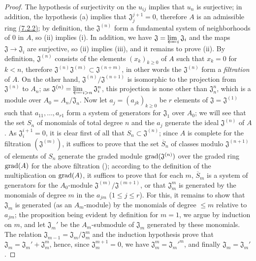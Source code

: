 \begin{proof}
\label{proof-0.7.2.7}
The hypothesis of surjectivity on the $u_{ij}$ implies that $u_n$ is surjective;
in addition, the hypothesis (a) implies that $\mathfrak{J}_j^{j+1}=0$, therefore
$A$ is an admissible ring \hyperref[0.7.2.2]{(7.2.2)}; by definition, the
$\mathfrak{J}^{(n)}$ form a fundamental system of neighborhoods of $0$ in $A$,
so (ii) implies (i). In addition, we have
$\mathfrak{J}=\varprojlim_i\mathfrak{J}_i$ and the maps
$\mathfrak{J}\to\mathfrak{J}_i$ are surjective, so (ii) implies (iii), and it
remains to prove (ii). By definition, $\mathfrak{J}^{(n)}$ consists of the
elements $(x_k)_{k\geqslant 0}$ of $A$ such that $x_k=0$ for $k<n$, therefore
$\mathfrak{J}^{(n)}\mathfrak{J}^{(m)}\subset\mathfrak{J}^{(n+m)}$, in other
words the $\mathfrak{J}^{(n)}$ form a {\em filtration} of $A$. On the other
hand, $\mathfrak{J}^{(n)}/\mathfrak{J}^{(n+1)}$ is isomorphic to the projection
from $\mathfrak{J}^{(n)}$ to $A_n$; as
$\mathfrak{J}^{(n)}=\varprojlim_{i>n}\mathfrak{J}_i^n$, this projection is none
other than $\mathfrak{J}_n^n$, which is a module over $A_0=A_n/\mathfrak{J}_n$.
Now let $a_j=(a_{jk})_{k\geqslant 0}$ be $r$ elements of
$\mathfrak{J}=\mathfrak{J}^{(1)}$ such that $a_{11},\dots,a_{r1}$ form a system
of generators for $\mathfrak{J}_1$ over $A_0$; we will see that the set $S_n$ of
monomials of total degree $n$ and the $a_j$ generate the ideal
$\mathfrak{J}^{(n)}$ of $A$. As $\mathfrak{J}_i^{i+1}=0$, it is clear first of
all that $S_n\subset\mathfrak{J}^{(n)}$; since $A$ is complete for the
filtration $(\mathfrak{J}^{(m)})$, it suffices to prove that the set
$\overline{S}_n$ of classes modulo $\mathfrak{J}^{(n+1)}$ of elements of $S_n$
generate the graded module ${\mathop{\mathrm{grad}}\nolimits}(\mathfrak{J}^{(n)})$ over the graded ring
${\mathop{\mathrm{grad}}\nolimits}(A)$ for the above filtration (\cite[p.~18--06, lemme]{I-1}); according to
the definition of the multiplication on ${\mathop{\mathrm{grad}}\nolimits}(A)$,
it suffices to prove that for each $m$, $\overline{S}_m$ is a system of
generators for the $A_0$-module $\mathfrak{J}^{(m)}/\mathfrak{J}^{(m+1)}$, or
that $\mathfrak{J}_m^m$ is generated by the monomials of degree $m$ in the
$a_{jm}$ ($1\leqslant j\leqslant r$). For this, it remains to show that
$\mathfrak{J}_m$ is generated (as an $A_m$-module) by the monomials of degree
$\leqslant m$ relative to $a_{jm}$; the proposition being evident by definition
for $m=1$, we argue by induction on $m$, and let $\mathfrak{J}_m'$ be the
$A_m$-submodule of $\mathfrak{J}_m$ generated by these monomials. The relation
$\mathfrak{J}_{m-1}=\mathfrak{J}_m/\mathfrak{J}_m^m$ and the induction
hypothesis prove that $\mathfrak{J}_m=\mathfrak{J}_m'+\mathfrak{J}_m^m$, hence,
since $\mathfrak{J}_m^{m+1}=0$, we have $\mathfrak{J}_m^m={\mathfrak{J}_m'}^m$,
and finally $\mathfrak{J}_m=\mathfrak{J}_m'$.
\end{proof}


